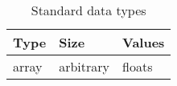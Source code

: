 \documentclass[a4paper, oneside, 11pt, article, english]{memoir}
\begin{document}
\begin{table}[htbp]
  \centering
  \caption{Standard data types}
  \label{tab:datatypes}
  \begin{threeparttable}
    \begin{tabular}{@{}lll@{}}
      \toprule
      Type             & Size               & Values                                          \\
      \midrule
      array & arbitrary & floats \\
      \bottomrule
    \end{tabular}
    \begin{tablenotes}
    \end{tablenotes}
  \end{threeparttable}
\end{table}
\end{document}
